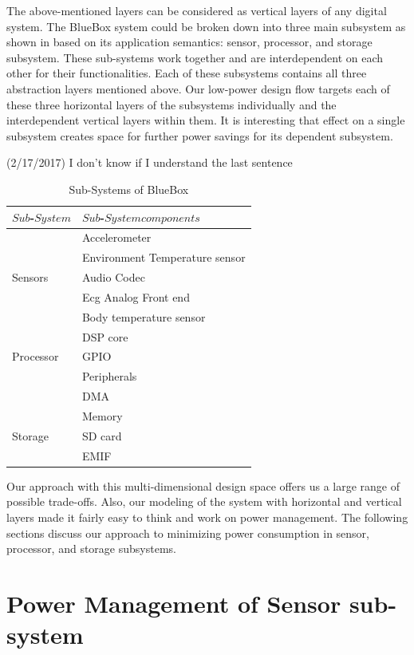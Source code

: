 The above-mentioned layers can be considered as vertical layers of
any digital system. The BlueBox system could be broken down into
three main subsystem as shown in  based on its
application semantics: sensor, processor, and storage subsystem.
These sub-systems work together and are interdependent on each other
for their functionalities. Each of these subsystems contains all
three abstraction layers mentioned above. Our low-power design flow
targets each of these three horizontal layers of the subsystems
individually and the interdependent vertical layers within them. It
is interesting that effect on a single subsystem creates space for
further power savings for its dependent subsystem. 
\begin{cmtPai}
	(2/17/2017) I don't know if I understand the last sentence
\end{cmtPai}
 
  \begin{table}
 	\caption{Sub-Systems of BlueBox}
 	\label{table:sub-system}
 	\centering
 	\begin{tabular}{|l|l|}
 		\hline
 		$Sub$-$System$ & $Sub$-$System  components$  \\
 		\hline
 		& Accelerometer \\
 		& Environment Temperature sensor \\
 		Sensors & Audio Codec \\
 		& Ecg Analog Front end \\
 		& Body temperature sensor\\
 		\hline
 		& DSP core \\
 		Processor & GPIO \\
 		& Peripherals \\
 		& DMA \\
 		& Memory \\
 		\hline
 		Storage & SD card \\
 		& EMIF \\
 		\hline
 	\end{tabular}
 \end{table}
 
 
Our approach with this multi-dimensional design space offers us a
large range of possible trade-offs. Also, our modeling of the system
with horizontal and vertical layers made it fairly easy to think and
work on power management. The following sections discuss our approach
to minimizing power consumption in sensor, processor, and storage
subsystems.
 
 \section{Power Management of Sensor sub-system}
 

